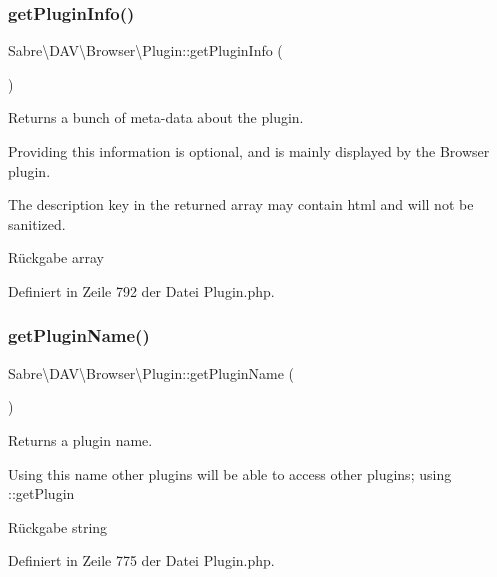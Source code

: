 \subsubsection{\texorpdfstring{get\+Plugin\+Info()}{getPluginInfo()}}
{\footnotesize\ttfamily Sabre\textbackslash{}\+D\+A\+V\textbackslash{}\+Browser\textbackslash{}\+Plugin\+::get\+Plugin\+Info (\begin{DoxyParamCaption}{ }\end{DoxyParamCaption})}

Returns a bunch of meta-\/data about the plugin.

Providing this information is optional, and is mainly displayed by the Browser plugin.

The description key in the returned array may contain html and will not be sanitized.

\begin{DoxyReturn}{Rückgabe}
array 
\end{DoxyReturn}


Definiert in Zeile 792 der Datei Plugin.\+php.

\mbox{\label{class_sabre_1_1_d_a_v_1_1_browser_1_1_plugin_a98a7935b3b6eefe6b47283ba0a1a781b}} 
\subsubsection{\texorpdfstring{get\+Plugin\+Name()}{getPluginName()}}
{\footnotesize\ttfamily Sabre\textbackslash{}\+D\+A\+V\textbackslash{}\+Browser\textbackslash{}\+Plugin\+::get\+Plugin\+Name (\begin{DoxyParamCaption}{ }\end{DoxyParamCaption})}

Returns a plugin name.

Using this name other plugins will be able to access other plugins; using \+::get\+Plugin

\begin{DoxyReturn}{Rückgabe}
string 
\end{DoxyReturn}


Definiert in Zeile 775 der Datei Plugin.\+php.

\mbox{\label{class_sabre_1_1_d_a_v_1_1_browser_1_1_plugin_aa1b1b31fea31df4236783c6bdc4dcac1}} 
